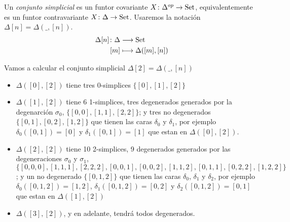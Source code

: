 \documentclass[../main.tex]{subfiles}
\begin{document}
\begin{defi}
    Un \emph{conjunto simplicial} es un funtor covariante $X\colon\Delta^{op} \to \mathop{\rm Set}$, equivalentemente es un funtor contravariante $X\colon \Delta \to \mathop{\rm Set}$.
    Usaremos la notaci\'on $\Delta[n]=\Delta(\_,[n])$.
    \begin{align*}
        \Delta[n]\colon \Delta & \longrightarrow \mathop{\rm Set} \\
        [m]                    & \longmapsto\!
        \begin{aligned}[t]
            \Delta([m],[n])
        \end{aligned}
    \end{align*}
\end{defi}
\begin{ex}
    Vamos a calcular el conjunto simplicial $\Delta[2]=\Delta(\_,[n])$
    \begin{itemize}
        \item $\Delta([0],[2])$ tiene tres 0-simplices $\{[0],[1],[2]\}$
        \item $\Delta([1],[2])$ tiene 6 1-simplices, tres degenerados generados por la degenarci\'on $\sigma_0$, $\{[0,0],[1,1],[2,2]\}$; y tres no degenerados $\{[0,1],[0,2],[1,2]\}$ que tienen las caras $\delta_0$ y $\delta_1$, por ejemplo $\delta_0([0,1]) = [0]$ y $\delta_1([0,1]) = [1]$ que estan en $\Delta([0],[2])$.
        \item $\Delta([2],[2])$ tiene 10 2-simplices, 9 degenerados generados por las degeneraciones $\sigma_0$ y $\sigma_1$, $\{[0,0,0],[1,1,1],[2,2,2],[0,0,1],[0,0,2],[1,1,2],[0,1,1],[0,2,2],[1,2,2]\}$; y un no degenerado $\{[0,1,2]\}$ que tienen las caras $\delta_0$, $\delta_1$ y $\delta_2$, por ejemplo $\delta_0([0,1,2]) = [1,2]$, $\delta_1([0,1,2]) = [0,2]$ y $\delta_2([0,1,2]) = [0,1]$ que estan en $\Delta([1],[2])$
        \item $\Delta([3],[2])$, y en adelante, tendr\'a todos degenerados.
    \end{itemize}
\end{ex}


\end{document}
